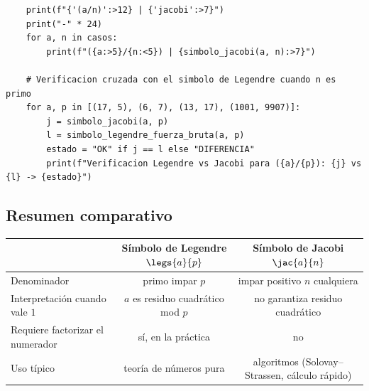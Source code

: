\begin{verbatim}
    print(f"{'(a/n)':>12} | {'jacobi':>7}")
    print("-" * 24)
    for a, n in casos:
        print(f"({a:>5}/{n:<5}) | {simbolo_jacobi(a, n):>7}")

    # Verificacion cruzada con el simbolo de Legendre cuando n es primo
    for a, p in [(17, 5), (6, 7), (13, 17), (1001, 9907)]:
        j = simbolo_jacobi(a, p)
        l = simbolo_legendre_fuerza_bruta(a, p)
        estado = "OK" if j == l else "DIFERENCIA"
        print(f"Verificacion Legendre vs Jacobi para ({a}/{p}): {j} vs {l} -> {estado}")

\end{verbatim}
\subsection{Resumen comparativo}

\begin{center}
\begin{tabular}{|l|c|c|}
\hline
& \textbf{Símbolo de Legendre } $\legs{a}{p}$ & \textbf{Símbolo de Jacobi } $\jac{a}{n}$\\
\hline
Denominador & primo impar $p$ & impar positivo $n$ cualquiera\\
\hline
Interpretación cuando vale $1$ & $a$ es residuo cuadrático mod $p$ & no garantiza residuo cuadrático\\
\hline
Requiere factorizar el numerador & sí, en la práctica & no\\
\hline
Uso típico & teoría de números pura & algoritmos (Solovay--Strassen, cálculo rápido)\\
\hline
\end{tabular}
\end{center}
